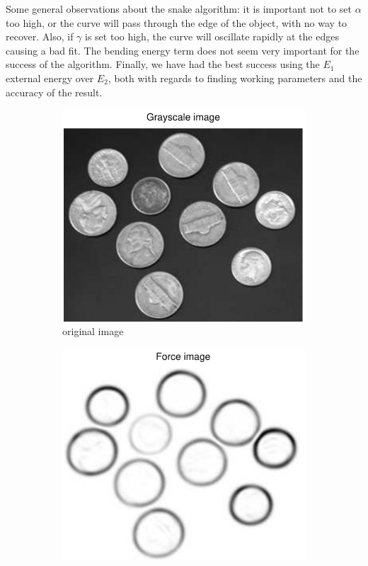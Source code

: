 \documentclass[11pt,a4paper]{article}
\begin{document}
Some general observations about the snake algorithm: it is important not to set $\alpha$ too high, or the curve will pass through the edge of the object, with no way to recover. Also, if $\gamma$ is set too high, the curve will oscillate rapidly at the edges causing a bad fit. The bending energy term does not seem very important for the success of the algorithm. Finally, we have had the best success using the $E_1$ external energy over $E_2$, both with regards to finding working parameters and the accuracy of the result.
%
\begin{figure}[H]
    \centering
    \begin{subfigure}[t]{0.24\textwidth}
        \includegraphics[width=\textwidth]{src/images/coins_gradient_gray.pdf}
        \caption{original image}
        \label{fig:coins_original}
    \end{subfigure}
    \begin{subfigure}[t]{0.24\textwidth}
        \includegraphics[width=\textwidth]{src/images/coins_gradient_forces.pdf}

\end{subfigure}
\end{figure}
\end{document}
